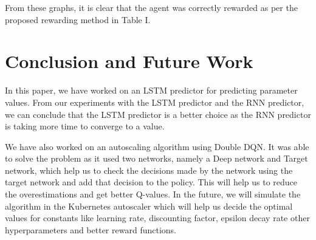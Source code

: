 \documentclass[conference]{IEEEtran}
\begin{document}
From these graphs, it is clear that the agent was correctly rewarded as per the proposed rewarding method in Table I. 

 \section*{Conclusion and Future Work}

In this paper, we have worked on an LSTM predictor for predicting parameter values. From our experiments with the LSTM predictor and the RNN predictor, we can conclude that the LSTM predictor is a better choice as the RNN predictor is taking more time to converge to a value. 

We have also worked on an autoscaling algorithm using Double DQN. It was able to solve the problem as it used two networks, namely a Deep network and Target network, which help us to check the decisions made by the network using the target network and add that decision to the policy. This will help us to reduce the overestimations and get better Q-values. In the future, we will simulate the algorithm in the Kubernetes autoscaler which will help us decide the optimal values for constants like learning rate, discounting factor, epsilon decay rate other hyperparameters and better reward functions. 
\end{document}
